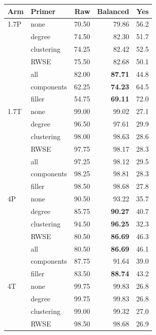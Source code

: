\documentclass[11pt]{article}
\begin{document}
\begin{table}[!t]
\centering\footnotesize\setlength{\tabcolsep}{4pt}
\begin{tabular}{llrrr}
\toprule
Arm & Primer & Raw & Balanced & Yes\\
\midrule
1.7P & none & 70.50 & 79.86 & 56.2\\ %
 & degree & 74.50 & 82.30 & 51.7\\ %
 & clustering & 74.25 & 82.42 & 52.5\\ %
 & RWSE & 75.50 & 82.68 & 50.1\\ %
 & all & 82.00 & \textbf{87.71} & 44.8\\ %
 & components & 62.25 & \textbf{74.23} & 64.5\\ %
 & filler & 54.75 & \textbf{69.11} & 72.0\\ %
\addlinespace[2pt]
1.7T & none & 99.00 & 99.02 & 27.1\\ %
 & degree & 96.50 & 97.61 & 29.9\\ %
 & clustering & 98.00 & 98.63 & 28.6\\ %
 & RWSE & 97.75 & 98.17 & 28.3\\ %
 & all & 97.25 & 98.12 & 29.5\\ %
 & components & 98.25 & 98.81 & 28.3\\ %
 & filler & 98.50 & 98.68 & 27.8\\ %
\addlinespace[2pt]
4P & none & 90.50 & 93.22 & 35.7\\ %
 & degree & 85.75 & \textbf{90.27} & 40.7\\ %
 & clustering & 94.50 & \textbf{96.25} & 32.3\\ %
 & RWSE & 80.50 & \textbf{86.69} & 46.3\\ %
 & all & 80.50 & \textbf{86.69} & 46.1\\ %
 & components & 87.75 & 91.64 & 39.0\\ %
 & filler & 83.50 & \textbf{88.74} & 43.2\\ %
\addlinespace[2pt]
4T & none & 99.75 & 99.83 & 26.8\\ %
 & degree & 99.75 & 99.83 & 26.8\\ %
 & clustering & 99.00 & 99.32 & 27.0\\ %
 & RWSE & 98.50 & 98.68 & 26.9\\ %

\end{tabular}
\end{table}
\end{document}
